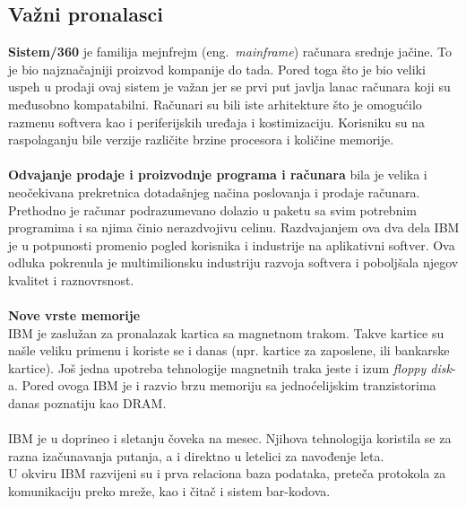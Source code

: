 \documentclass[a4paper]{article}
\begin{document}
\subsection{Važni pronalasci} %
\textbf{Sistem/360} je familija mejnfrejm (eng.~{\em mainframe}) računara srednje jačine. To je bio najznačajniji proizvod kompanije do tada. Pored toga što je bio veliki uspeh u prodaji ovaj sistem je važan jer se prvi put javlja lanac računara koji su međusobno kompatabilni.
Računari su bili iste arhitekture što je omogućilo razmenu softvera kao i periferijskih uređaja i kostimizaciju. Korisniku su na raspolaganju bile verzije različite brzine procesora i količine memorije. \\ \\
\textbf{Odvajanje prodaje i proizvodnje programa i računara} bila je velika i neočekivana prekretnica dotadašnjeg načina poslovanja i prodaje računara. Prethodno je računar podrazumevano dolazio u paketu sa svim potrebnim programima i sa njima činio nerazdvojivu celinu. Razdvajanjem ova dva dela IBM je u potpunosti promenio pogled korisnika i industrije na aplikativni softver. Ova odluka pokrenula je multimilionsku industriju razvoja softvera i poboljšala njegov kvalitet i raznovrsnost. \\ \\
\textbf{Nove vrste memorije}\\
IBM je zaslužan za pronalazak kartica sa magnetnom trakom. Takve kartice su našle veliku primenu i koriste se i danas (npr. kartice za zaposlene, ili bankarske kartice). %
Još jedna upotreba tehnologije magnetnih traka jeste i izum \emph{floppy disk}-a. %
Pored ovoga IBM je i razvio brzu memoriju sa jednoćelijskim tranzistorima danas poznatiju kao DRAM.%
\\ \\
IBM je u doprineo i sletanju čoveka na mesec. Njihova tehnologija koristila se za razna izačunavanja putanja, a i direktno u letelici za navođenje leta.\\
U okviru IBM razvijeni su i prva relaciona baza podataka, preteča protokola za komunikaciju preko mreže, kao i čitač i sistem bar-kodova.
%
\end{document}
